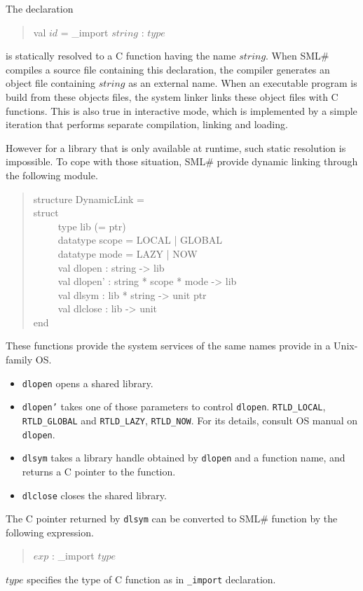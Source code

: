 \documentclass{jbook}
\newcommand{\smlsharp}{SML\#}
\newenvironment{program}{\begin{tt}\begin{quote}}{\end{quote}\end{tt}}
\newcommand{\myem}{\ \ \ \ \  }
\begin{document}
	The declaration
\begin{program}
val $id$ = \_import $string$ : $type$
\end{program}
is statically resolved to a C function having the name $string$.
	When \smlsharp{} compiles a source file containing this
declaration, the compiler generates an object file containing $string$
as an external name.
	When an executable program is build from these objects files,
the system linker links these object files with C functions.
	This is also true in interactive mode, which is implemented by
a simple iteration that performs separate compilation, linking and
loading.

	However for a library that is only available at runtime, such
static resolution  is impossible.
	To cope with those situation, \smlsharp{} provide dynamic
linking through the following module.
\begin{program}
structure DynamicLink =\\
struct\\
\myem  type lib (= ptr)\\
\myem  datatype scope = LOCAL | GLOBAL\\
\myem  datatype mode = LAZY | NOW\\
\myem  val dlopen : string -> lib\\
\myem  val dlopen' : string * scope * mode -> lib\\
\myem  val dlsym : lib * string -> unit ptr\\
\myem  val dlclose : lib -> unit\\
end
\end{program}
	These functions provide the system services of the same names
provide in a Unix-family OS.
\begin{itemize}
\item  {\tt dlopen} opens a shared library.
\item  {\tt dlopen'} takes one of those parameters to control {\tt dlopen}.
{\tt RTLD\_LOCAL}, {\tt RTLD\_GLOBAL} and
{\tt RTLD\_LAZY}, {\tt RTLD\_NOW}.
	For its details, consult OS manual on {\tt dlopen}.
\item {\tt dlsym} takes a library handle obtained by {\tt dlopen}
and a function name, and returns a C pointer to the function.
\item  {\tt dlclose} closes the shared library.
\end{itemize}
	The C pointer returned by {\tt dlsym} can be converted to 
\smlsharp{} function by the following expression.
\begin{program}
$exp$ : \_import  $type$
\end{program}
	$type$ specifies the type of C function as in {\tt \_import} declaration.
\end{document}
